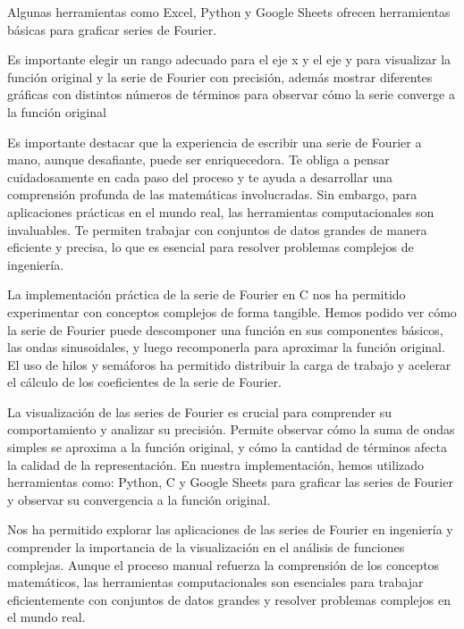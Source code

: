 Algunas herramientas como Excel, Python y Google Sheets ofrecen herramientas básicas para graficar series de Fourier.

Es importante elegir un rango adecuado para el eje x y el eje y para visualizar la función original y la serie de Fourier con precisión, además mostrar diferentes gráficas con distintos números de términos para observar cómo la serie converge a la función original

Es importante destacar que la experiencia de escribir una serie de Fourier a mano, aunque desafiante, puede ser enriquecedora. Te obliga a pensar cuidadosamente en cada paso del proceso y te ayuda a desarrollar una comprensión profunda de las matemáticas involucradas. Sin embargo, para aplicaciones prácticas en el mundo real, las herramientas computacionales son invaluables. Te permiten trabajar con conjuntos de datos grandes de manera eficiente y precisa, lo que es esencial para resolver problemas complejos de ingeniería.

La implementación práctica de la serie de Fourier en C nos ha permitido experimentar con conceptos complejos de forma tangible. Hemos podido ver cómo la serie de Fourier puede descomponer una función en sus componentes básicos, las ondas sinusoidales, y luego recomponerla para aproximar la función original. El uso de hilos y semáforos ha permitido distribuir la carga de trabajo y acelerar el cálculo de los coeficientes de la serie de Fourier.

La visualización de las series de Fourier es crucial para comprender su comportamiento y analizar su precisión. Permite observar cómo la suma de ondas simples se aproxima a la función original, y cómo la cantidad de términos afecta la calidad de la representación. En nuestra implementación, hemos utilizado herramientas como: Python, C y Google Sheets para graficar las series de Fourier y observar su convergencia a la función original.

Nos ha permitido explorar las aplicaciones de las series de Fourier en ingeniería y comprender la importancia de la visualización en el análisis de funciones complejas. Aunque el proceso manual refuerza la comprensión de los conceptos matemáticos, las herramientas computacionales son esenciales para trabajar eficientemente con conjuntos de datos grandes y resolver problemas complejos en el mundo real.

